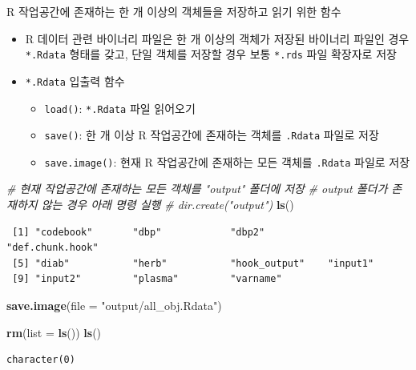 \documentclass[
  11pt,
]{krantz}
\newenvironment{Shaded}{\begin{snugshade}}{\end{snugshade}}
\newcommand{\CommentTok}[1]{\textcolor[rgb]{0.37,0.37,0.37}{\textit{#1}}}
\newcommand{\DataTypeTok}[1]{\textcolor[rgb]{0.27,0.27,0.27}{#1}}
\newcommand{\KeywordTok}[1]{\textcolor[rgb]{0.27,0.27,0.27}{\textbf{#1}}}
\newcommand{\NormalTok}[1]{#1}
\newcommand{\StringTok}[1]{\textcolor[rgb]{0.5,0.5,0.5}{#1}}
\providecommand{\tightlist}{%
  \setlength{\itemsep}{0pt}\setlength{\parskip}{0pt}}
\begin{document}
R 작업공간에 존재하는 한 개 이상의 객체들을 저장하고 읽기 위한 함수

\begin{itemize}
\item
  R 데이터 관련 바이너리 파일은 한 개 이상의 객체가 저장된 바이너리 파일인 경우 \texttt{*.Rdata} 형태를 갖고, 단일 객체를 저장할 경우 보통 \texttt{*.rds} 파일 확장자로 저장
\item
  \texttt{*.Rdata} 입출력 함수

  \begin{itemize}
  \tightlist
  \item
    \texttt{load()}: \texttt{*.Rdata} 파일 읽어오기
  \item
    \texttt{save()}: 한 개 이상 R 작업공간에 존재하는 객체를 \texttt{.Rdata} 파일로 저장
  \item
    \texttt{save.image()}: 현재 R 작업공간에 존재하는 모든 객체를 \texttt{.Rdata} 파일로 저장
  \end{itemize}
\end{itemize}

\footnotesize

\begin{Shaded}
\begin{Highlighting}[]
\CommentTok{# 현재 작업공간에 존재하는 모든 객체를 "output" 폴더에 저장}
\CommentTok{# output 폴더가 존재하지 않는 경우 아래 명령 실행}
\CommentTok{# dir.create("output") }
\KeywordTok{ls}\NormalTok{()}
\end{Highlighting}
\end{Shaded}

\begin{verbatim}
 [1] "codebook"       "dbp"            "dbp2"           "def.chunk.hook"
 [5] "diab"           "herb"           "hook_output"    "input1"        
 [9] "input2"         "plasma"         "varname"       
\end{verbatim}

\begin{Shaded}
\begin{Highlighting}[]
\KeywordTok{save.image}\NormalTok{(}\DataTypeTok{file =} \StringTok{"output/all_obj.Rdata"}\NormalTok{)}

\KeywordTok{rm}\NormalTok{(}\DataTypeTok{list =} \KeywordTok{ls}\NormalTok{()) }
\KeywordTok{ls}\NormalTok{()}
\end{Highlighting}
\end{Shaded}

\begin{verbatim}
character(0)
\end{verbatim}
\end{document}
